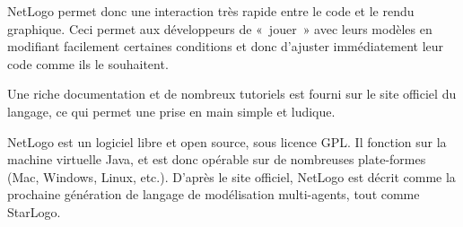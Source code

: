 NetLogo permet donc une interaction très rapide entre le code et le rendu graphique. Ceci permet aux développeurs de «~jouer~» avec leurs modèles en modifiant facilement certaines conditions et donc d'ajuster immédiatement leur code comme ils le souhaitent.

Une riche documentation et de nombreux tutoriels est fourni sur le site officiel du langage, ce qui permet une prise en main simple et ludique.

NetLogo est un logiciel libre et open source, sous licence GPL. Il fonction sur la machine virtuelle Java, et est donc opérable sur de nombreuses plate-formes (Mac, Windows, Linux, etc.).
D'après le site officiel, NetLogo est décrit comme la prochaine génération de langage de modélisation multi-agents, tout comme StarLogo.


